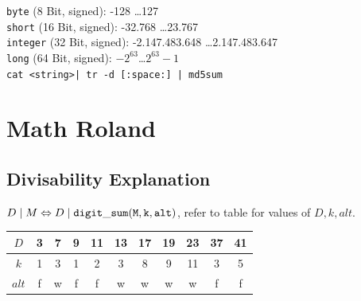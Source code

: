 \documentclass[10pt,a4paper,ngerman,oneside,]{article}
\begin{document}
\begin{multicols}{2}
{}

\vspace{1em}
\noindent
\texttt{byte} (8 Bit, signed): -128 \dots 127\\
\texttt{short} (16 Bit, signed): -32.768 \dots 23.767\\
\texttt{integer} (32 Bit, signed): -2.147.483.648 \dots 2.147.483.647\\
\texttt{long} (64 Bit, signed): $-2^{63}$\dots $2^{63}-1$\\

\newcommand{\hash}[1]{{\bfseries MD5:} ~\texttt{#1}}
\vspace{1.2em} \texttt{\small cat <string>| tr -d [:space:] | md5sum}\\


\section{Math Roland}
\subsection{Divisability Explanation}
$D \mid M \Leftrightarrow D \mid {\tt digit\_sum(M, k, alt)}$, refer to table for values of $D, k, alt$.
\begin{table}[htbp]
\begin{tabular}{| c || c | c | c | c | c | c | c | c | c | c |}
\hline
$D$ & 3 & 7 & 9 & 11 & 13 & 17 & 19 & 23 & 37 & 41 \\
\hline
$k$ & 1 & 3 & 1 & 2 & 3 & 8 & 9 & 11 & 3 & 5 \\
\hline
$alt$ & f & w & f & f & w & w & w & w & f & f \\ 
\hline
\end{tabular}
\end{table}

\end{multicols}
\end{document}
